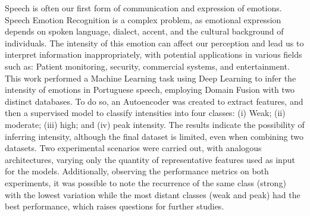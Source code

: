 Speech is often our first form of communication and expression of emotions. Speech Emotion Recognition is a complex problem, as emotional expression depends on spoken language, dialect, accent, and the cultural background of individuals. The intensity of this emotion can affect our perception and lead us to interpret information inappropriately, with potential applications in various fields such as: Patient monitoring, security, commercial systems, and entertainment. This work performed a Machine Learning task using Deep Learning to infer the intensity of emotions in Portuguese speech, employing Domain Fusion with two distinct databases. To do so, an Autoencoder was created to extract features, and then a supervised model to classify intensities into four classes: (i) Weak; (ii) moderate; (iii) high; and (iv) peak intensity. The results indicate the possibility of inferring intensity, although the final dataset is limited, even when combining two datasets. Two experimental scenarios were carried out, with analogous architectures, varying only the quantity of representative features used as input for the models. Additionally, observing the performance metrics on both experiments, it was possible to note the recurrence of the same class (strong) with the lowest variation while the most distant classes (weak and peak) had the best performance, which raises questions for further studies.